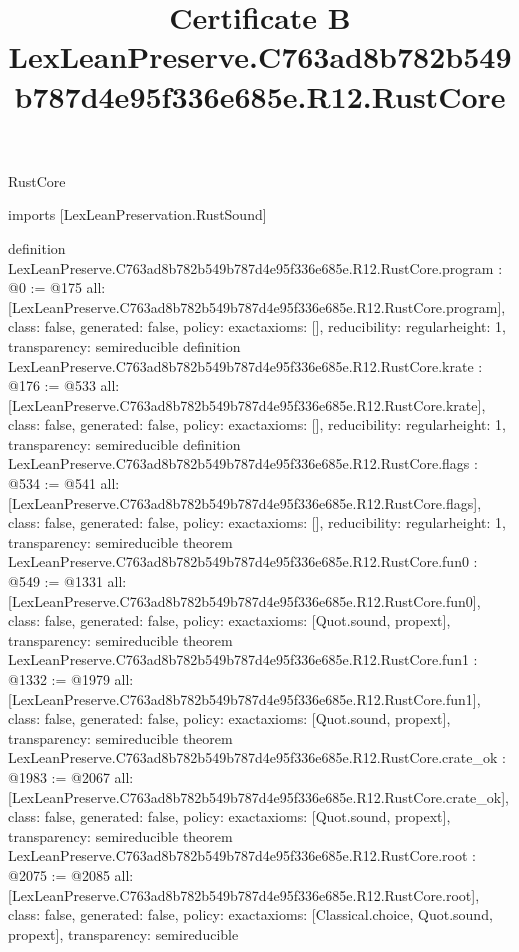 \begin{lexlean}{RustCore}
\title{Certificate B LexLeanPreserve.C763ad8b782b549b787d4e95f336e685e.R12.RustCore}
\begin{coremodule}
imports [LexLeanPreservation.RustSound]

definition LexLeanPreserve.C763ad8b782b549b787d4e95f336e685e.R12.RustCore.program : @0 := @175 {
  all: [LexLeanPreserve.C763ad8b782b549b787d4e95f336e685e.R12.RustCore.program],
  class: false,
  generated: false,
  policy: exact{axioms: []},
  reducibility: regular{height: 1},
  transparency: semireducible
}
definition LexLeanPreserve.C763ad8b782b549b787d4e95f336e685e.R12.RustCore.krate : @176 := @533 {
  all: [LexLeanPreserve.C763ad8b782b549b787d4e95f336e685e.R12.RustCore.krate],
  class: false,
  generated: false,
  policy: exact{axioms: []},
  reducibility: regular{height: 1},
  transparency: semireducible
}
definition LexLeanPreserve.C763ad8b782b549b787d4e95f336e685e.R12.RustCore.flags : @534 := @541 {
  all: [LexLeanPreserve.C763ad8b782b549b787d4e95f336e685e.R12.RustCore.flags],
  class: false,
  generated: false,
  policy: exact{axioms: []},
  reducibility: regular{height: 1},
  transparency: semireducible
}
theorem LexLeanPreserve.C763ad8b782b549b787d4e95f336e685e.R12.RustCore.fun0 : @549 := @1331 {
  all: [LexLeanPreserve.C763ad8b782b549b787d4e95f336e685e.R12.RustCore.fun0],
  class: false,
  generated: false,
  policy: exact{axioms: [Quot.sound, propext]},
  transparency: semireducible
}
theorem LexLeanPreserve.C763ad8b782b549b787d4e95f336e685e.R12.RustCore.fun1 : @1332 := @1979 {
  all: [LexLeanPreserve.C763ad8b782b549b787d4e95f336e685e.R12.RustCore.fun1],
  class: false,
  generated: false,
  policy: exact{axioms: [Quot.sound, propext]},
  transparency: semireducible
}
theorem LexLeanPreserve.C763ad8b782b549b787d4e95f336e685e.R12.RustCore.crate_ok : @1983 := @2067 {
  all: [LexLeanPreserve.C763ad8b782b549b787d4e95f336e685e.R12.RustCore.crate_ok],
  class: false,
  generated: false,
  policy: exact{axioms: [Quot.sound, propext]},
  transparency: semireducible
}
theorem LexLeanPreserve.C763ad8b782b549b787d4e95f336e685e.R12.RustCore.root : @2075 := @2085 {
  all: [LexLeanPreserve.C763ad8b782b549b787d4e95f336e685e.R12.RustCore.root],
  class: false,
  generated: false,
  policy: exact{axioms: [Classical.choice, Quot.sound, propext]},
  transparency: semireducible
}


\end{coremodule}
\end{lexlean}
